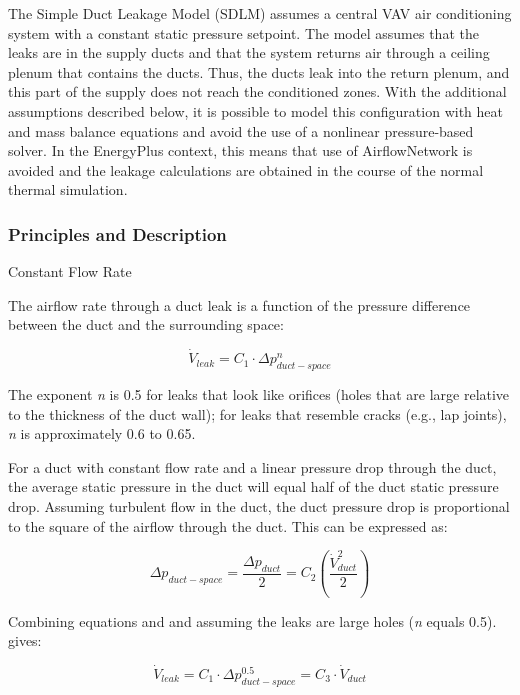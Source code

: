 The Simple Duct Leakage Model (SDLM) assumes a central VAV air conditioning system with a constant static pressure setpoint. The model assumes that the leaks are in the supply ducts and that the system returns air through a ceiling plenum that contains the ducts. Thus, the ducts leak into the return plenum, and this part of the supply does not reach the conditioned zones. With the additional assumptions described below, it is possible to model this configuration with heat and mass balance equations and avoid the use of a nonlinear pressure-based solver. In the EnergyPlus context, this means that use of AirflowNetwork is avoided and the leakage calculations are obtained in the course of the normal thermal simulation.

\subsubsection{Principles and Description}\label{principles-and-description}

Constant Flow Rate

The airflow rate through a duct leak is a function of the pressure difference between the duct and the surrounding space:

\begin{equation}
{\dot V_{leak}} = {C_1} \cdot \Delta p_{duct - space}^n
\end{equation}

The exponent \emph{n} is 0.5 for leaks that look like orifices (holes that are large relative to the thickness of the duct wall); for leaks that resemble cracks (e.g., lap joints), \emph{n} is approximately 0.6 to 0.65.

For a duct with constant flow rate and a linear pressure drop through the duct, the average static pressure in the duct will equal half of the duct static pressure drop. Assuming turbulent flow in the duct, the duct pressure drop is proportional to the square of the airflow through the duct. This can be expressed as:

\begin{equation}
\Delta {p_{duct - space}} = \frac{{\Delta {p_{duct}}}}{2} = {C_2}\left( {\frac{{\dot V_{duct}^2}}{2}} \right)
\end{equation}

Combining equations and and assuming the leaks are large holes (\emph{n} equals 0.5). gives:

\begin{equation}
{\dot V_{leak}} = {C_1} \cdot \Delta p_{duct - space}^{0.5} = {C_3} \cdot {\dot V_{duct}}
\end{equation}

